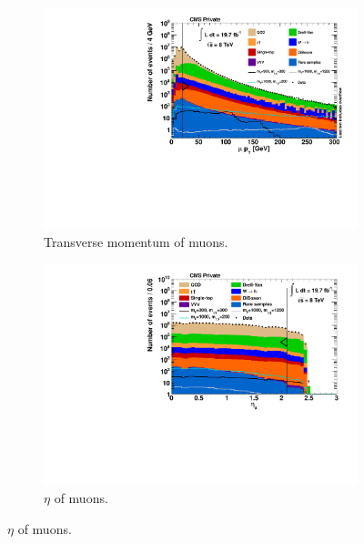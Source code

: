 \begin{figure}[!htbp]
  \centering
  \begin{subfigure}[b]{0.495\textwidth}
    \centering
    \includegraphics[width=\textwidth]{plots/nMuon_pt.pdf}
    \caption{Transverse momentum of muons.\label{fig:muo_pt}}
  \end{subfigure}
  \begin{subfigure}[b]{0.495\textwidth}
    \centering
    \includegraphics[width=\textwidth]{plots/nMuon_eta.pdf}
    \caption{$\eta$ of muons.\label{fig:muo_eta}}
  \end{subfigure}
\end{figure}

